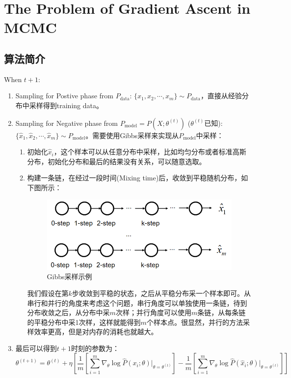 \documentclass[a4paper]{article}
\begin{document}
\section{The Problem of Gradient Ascent in MCMC}
\subsection{算法简介}
\noindent When $t+1$:
\begin{enumerate}
    \item Sampling for Postive phase from $P_{\mathrm{data}}$: $\{x_1,x_2,\cdots,x_m\}\sim P_{\mathrm{data}}$，直接从经验分布中采样得到training data。
    \item Sampling for Negative phase from $P_{\mathrm{model}}=P(X;\theta^{(t)})$ ($\theta^{(t)}$已知): $\{\hat{x}_1,\hat{x}_2,\cdots,\hat{x}_m\}\sim P_{\mathrm{model}}$。需要使用Gibbs采样来实现从$P_{\mathrm{model}}$中采样：
    \begin{enumerate}
        \item 初始化$\hat{x}_i$，这个样本可以从任意分布中采样，比如均匀分布或者标准高斯分布，初始化分布和最后的结果没有关系，可以随意选取。
        \item 构建一条链，在经过一段时间(Mixing time)后，收敛到平稳随机分布，如下图所示：
        \begin{figure}[H]
        \centering
        \includegraphics[width=.55\textwidth]{微信图片_20200309153828.png}
        \caption{Gibbs采样示例}
        \label{fig:my_label_1}
        \end{figure}
        我们假设在第$k$步收敛到平稳的状态，之后从平稳分布采一个样本即可。从串行和并行的角度来考虑这个问题，串行角度可以单独使用一条链，待到分布收敛之后，从分布中采$m$次样；并行角度可以使用$m$条链，从每条链的平稳分布中采1次样，这样就能得到$m$个样本点。很显然，并行的方法采样效率更高，但是对内存的消耗也就越大。
    \end{enumerate}
    \item 最后可以得到$t+1$时刻的参数为：
    $$
    \theta^{(t+1)} = \theta^{(t)} + \eta \left[ \frac{1}{m} \left[ \sum_{i=1}^m \nabla_\theta \log \hat{P}(x_i;\theta)|_{\theta=\theta^{(t)}} \right] - \frac{1}{m} \left[ \sum_{i=1}^m \nabla_\theta \log \hat{P}(\hat{x}_i;\theta)|_{\theta=\theta^{(t)}} \right]
    \right]
    $$
\end{enumerate}
\end{document}
